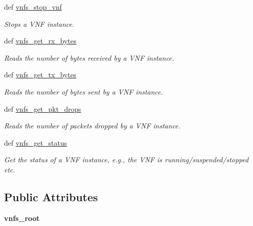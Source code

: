 \begin{DoxyCompactItemize}
def \hyperlink{classvnfs__operations_1_1VNFSOperations_a3c95617427fa157dbde8246a260546ed}{vnfs\-\_\-stop\-\_\-vnf}
\begin{DoxyCompactList}\small\item\em Stops a V\-N\-F instance. \end{DoxyCompactList}\item 
def \hyperlink{classvnfs__operations_1_1VNFSOperations_a27409856538f49f14a8506635ded95b7}{vnfs\-\_\-get\-\_\-rx\-\_\-bytes}
\begin{DoxyCompactList}\small\item\em Reads the number of bytes received by a V\-N\-F instance. \end{DoxyCompactList}\item 
def \hyperlink{classvnfs__operations_1_1VNFSOperations_ab4617f4573ef7d6c4106b0fdbf728022}{vnfs\-\_\-get\-\_\-tx\-\_\-bytes}
\begin{DoxyCompactList}\small\item\em Reads the number of bytes sent by a V\-N\-F instance. \end{DoxyCompactList}\item 
def \hyperlink{classvnfs__operations_1_1VNFSOperations_a05a7ab8ae7e8a2ab7502a1d4e0113144}{vnfs\-\_\-get\-\_\-pkt\-\_\-drops}
\begin{DoxyCompactList}\small\item\em Reads the number of packets dropped by a V\-N\-F instance. \end{DoxyCompactList}\item 
def \hyperlink{classvnfs__operations_1_1VNFSOperations_ac2787ee33d5944c39a07321e270bdcfd}{vnfs\-\_\-get\-\_\-status}
\begin{DoxyCompactList}\small\item\em Get the status of a V\-N\-F instance, e.\-g., the V\-N\-F is running/suspended/stopped etc. \end{DoxyCompactList}\end{DoxyCompactItemize}
\subsection*{Public Attributes}
\begin{DoxyCompactItemize}
\item 
\hypertarget{classvnfs__operations_1_1VNFSOperations_a88ae8c710ff0d9f76a72d2da2d736e34}{{\bfseries vnfs\-\_\-root}}\label{classvnfs__operations_1_1VNFSOperations_a88ae8c710ff0d9f76a72d2da2d736e34}

\end{DoxyCompactItemize}
